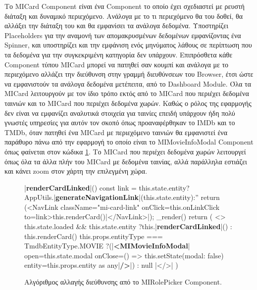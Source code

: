 Το MICard Component είναι ένα Component το οποίο έχει σχεδιαστεί με ρευστή διάταξη και δυναμικό περιεχόμενο. Ανάλογα με το τι περιεχόμενο θα του δοθεί, θα αλλάξει την διάταξη του και θα εμφανίσει τα ανάλογα δεδομένα. Υποστηρίζει Placeholders για την αναμονή των απομακρυσμένων δεδομένων εμφανίζοντας ένα Spinner, και υποστηρίζει και την εμφάνιση ενός μηνύματος λάθους σε περίπτωση που τα δεδομένα για την συγκεκριμένη κατηγορία δεν υπάρχουν. Επιπρόσθετα κάθε Component τύπου MICard μπορεί να πατηθεί σαν κουμπί και ανάλογα με το περιεχόμενο αλλάζει την διεύθυνση στην γραμμή διευθύνσεων του Browser, έτσι ώστε να εμφανιστούν τα ανάλογα δεδομένα μετέπειτα, από το Dashboard Module. Όλα τα MICard λειτουργούν με τον ίδιο τρόπο εκτός από το MICard που περιέχει δεδομένα ταινιών και το MICard που περιέχει δεδομένα χωρών. Καθώς ο ρόλος της εφαρμογής δεν είναι να εμφανίζει αναλυτικά στοιχεία για ταινίες επειδή υπάρχουν ήδη πολύ γνωστές υπηρεσίες για αυτόν τον σκοπό όπως προαναφέρθηκαν το IMDb και το TMDb, όταν πατηθεί ένα MICard με περιεχόμενο ταινιών θα εμφανιστεί ένα παράθυρο πάνω από την εφαρμογή το οποίο είναι το MIMovieInfoModal Component όπως φαίνεται στον κώδικα \ref{code:micard_click}. Το MICard που περιέχει δεδομένα χωρών λειτουργεί όπως όλα τα άλλα πλήν του MICard με δεδομένα ταινίας, αλλά παράλληλα εστιάζει και κάνει zoom στον χάρτη την επιλεγμένη χώρα.
\begin{figure}[H]
    \begin{TypeScriptcode}
|\textbf{renderCardLinked}|() {
  const link = this.state.entity?AppUtils.|\textbf{generateNavigationLink}|(this.state.entity):''
  return (<NavLink className="mi-card-link" onClick={this.onLinkClick} to={link}>{this.renderCard()}|</NavLink>|);
}
_render() {
  return (
    <>
      {this.state.loaded && this.state.entity ?this.|\textbf{renderCardLinked}|() : this.renderCard()}
      {this.props.entityType === TmdbEntityType.MOVIE ?(|\textbf{<MIMovieInfoModal}| open={this.state.modal} onClose={() => this.setState({modal: false})} entity={this.props.entity as any}|\textbf{/>}|) : null}
    |</>|
  )
}
    \end{TypeScriptcode}
    \caption{Αλγόριθμος αλλαγής διεύθυνσης από το MIRolePicker Component.}
   \label{code:micard_click}
\end{figure}

